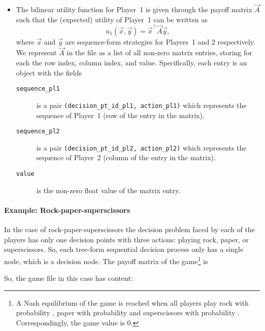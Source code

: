 \documentclass{homework}
\begin{document}
\begin{itemize}
\begin{remark}
    \end{remark}
    \item The bilinear utility function for Player~1 is given through the payoff matrix $\vec{A}$ such that the (expected) utility of Player~1 can be written as
    \[
        u_1(\vec{x}, \vec{y}) = \vec{x}^\top\!\!\vec{A}\vec{y},
    \]
    where $\vec{x}$ and $\vec{y}$ are sequence-form strategies for Players~1 and 2 respectively. We represent $\vec{A}$ in the file as a list of all non-zero matrix entries, storing for each the row index, column index, and value. Specifically, each entry is an object with the fields
    \begin{description}
        \item[\texttt{sequence\_pl1}] is a pair \verb|(decision_pt_id_pl1, action_pl1)| which represents the sequence of Player~1 (row of the entry in the matrix).
        \item[\texttt{sequence\_pl2}] is a pair \verb|(decision_pt_id_pl2, action_pl2)| which represents the sequence of Player~2 (column of the entry in the matrix).
        \item[\texttt{value}] is the non-zero float value of the matrix entry. 
    \end{description}
\end{itemize}

\paragraph{Example: Rock-paper-superscissors}

In the case of rock-paper-superscissors the decision problem faced by each of the players has only one decision points with three actions: playing rock, paper, or superscissors. So, each tree-form sequential decision process only has a single node, which is a decision node. The payoff matrix of the game\footnote{A Nash equilibrium of the game is reached when all players play rock with probability , paper with probability  and superscissors with probability . Correspondingly, the game value is $0$.} is
\begin{center}
\end{center}
So, the game file in this case has content:
\end{document}
